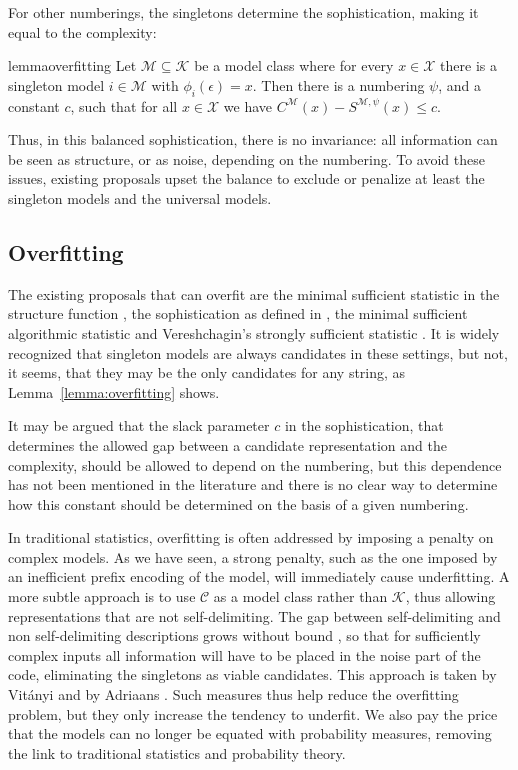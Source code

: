 \documentclass{style/llncs}
\newcommand{\M}{\mathscr M}
\newcommand{\C}{\mathscr C}
\newcommand{\K}{\mathscr K}
\newcommand{\X}{\mathscr X}
\begin{document}
\noindent For other numberings, the singletons determine the sophistication, making it equal to the complexity:
\begin{restatable}[Overfitting]{lemma}{overfitting}
Let $\M \subseteq \K$ be a model class where for every $x\in\X$ there is a singleton model $i\in\M$ with $\phi_i(\epsilon)=x$. Then there is a numbering $\psi$, and a constant $c$, such that for all $x\in\X$ we have $C^\M(x)-S^{\M,\psi}(x)\leq c$.\label{lemma:overfitting}
\end{restatable}
\noindent Thus, in this balanced sophistication, there is no invariance: all information can be seen as structure, or as noise, depending on the numbering. To avoid these issues, existing proposals upset the balance to exclude or penalize at least the singleton models and the universal models.
 
\subsection{Overfitting}

The existing proposals that can overfit are the minimal sufficient statistic in the structure function \cite{cover1985kolmogorov}, the sophistication as defined in \cite{mota2013sophistication}, the minimal sufficient algorithmic statistic \cite{gacs2001algorithmic} and Vereshchagin's strongly sufficient statistic \cite{vereshchagin2013algorithmic}. It is widely recognized that singleton models are always candidates in these settings, but not, it seems, that they may be the only candidates for any string, as Lemma~\ref{lemma:overfitting} shows. 

It may be argued that the slack parameter $c$ in the sophistication, that determines the allowed gap between a candidate representation and the complexity, should be allowed to depend on the numbering, but this dependence has not been mentioned in the literature and there is no clear way to determine how this constant should be determined on the basis of a given numbering. 

In traditional statistics, overfitting is often addressed by imposing a penalty on complex models. As we have seen, a strong penalty, such as the one imposed by an inefficient prefix encoding of the model, will immediately cause underfitting. A more subtle approach is to use $\C$ as a model class rather than $\K$, thus allowing representations that are not self-delimiting. The gap between self-delimiting and non self-delimiting descriptions grows without bound 
\cite[Section~4.5.5]{vitanyi2004meaningful}, so that for sufficiently complex inputs all information will have to be placed in the noise part of the code, eliminating the singletons as viable candidates. This approach is taken by Vit\'anyi \cite{vitanyi2004meaningful} and by Adriaans \cite{adriaans2012facticity}. Such measures thus help reduce the overfitting problem, but they only increase the tendency to underfit. We also pay the price that the models can no longer be equated with probability measures, removing the link to traditional statistics and probability theory.
\end{document}
